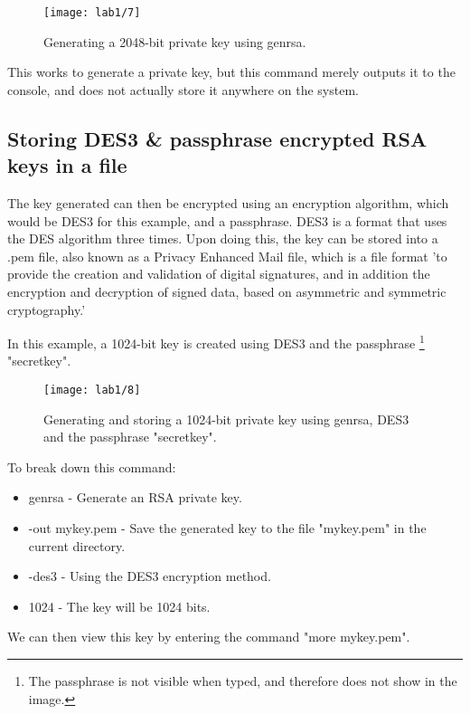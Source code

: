 \begin{figure}[H]
    \centering
    \texttt{[image: lab1/7]}
    \caption{Generating a 2048-bit private key using genrsa.}
    \label{fig:genrsa}
\end{figure}

This works to generate a private key, but this command merely outputs it to the console, and does not actually
store it anywhere on the system.

\pagebreak

\subsection{Storing DES3 \& passphrase encrypted RSA keys in a file}\label{subsec:storing-keys-in-file}
The key generated can then be encrypted using an encryption algorithm, which would be DES3 for this example,
and a passphrase.
DES3 is a format that uses the DES algorithm three times.
Upon doing this, the key can be stored into a .pem file, also known as a Privacy Enhanced Mail file, which is
a file format 'to provide the creation and validation of digital signatures, and in addition the
encryption and decryption of signed data, based on asymmetric and symmetric cryptography.'
~\autocite[p. 1894]{PEMFormat}

In this example, a 1024-bit key is created using DES3 and the passphrase
\footnote{The passphrase is not visible when typed, and therefore does not show in the image.} "secretkey".

\begin{figure}[H]
    \centering
    \texttt{[image: lab1/8]}
    \caption{Generating and storing a 1024-bit private key using genrsa, DES3 and the passphrase "secretkey".}
    \label{fig:DES3Key}
\end{figure}

To break down this command:
\begin{itemize}
    \item genrsa - Generate an RSA private key.
    \item -out mykey.pem - Save the generated key to the file "mykey.pem" in the current directory.
    \item -des3 - Using the DES3 encryption method.
    \item 1024 - The key will be 1024 bits.\newline
\end{itemize}


We can then view this key by entering the command "more mykey.pem".

